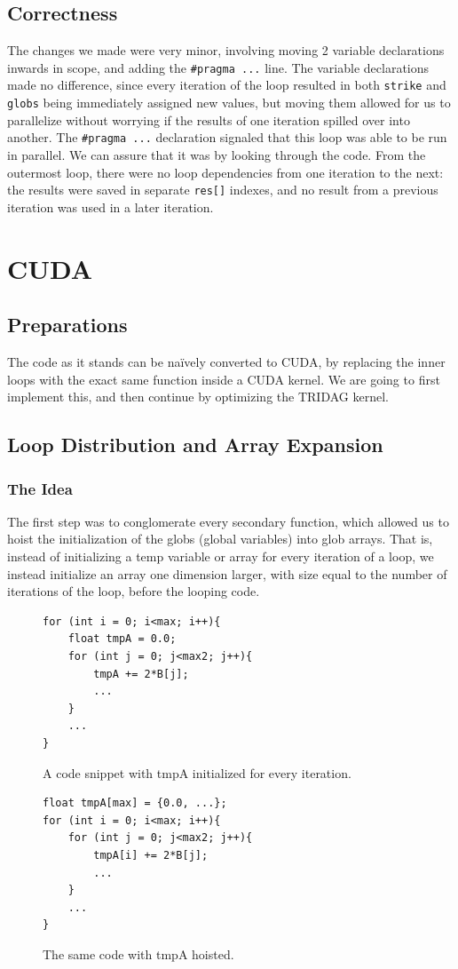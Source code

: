 \documentclass[12pt, oneside]{article}
\begin{document}
\subsection{Correctness}
The changes we made were very minor, involving moving 2 variable declarations inwards in scope, and adding the \texttt{\#pragma ...} line. The variable declarations made no difference, since every iteration of the loop resulted in both \texttt{strike} and \texttt{globs} being immediately assigned new values, but moving them allowed for us to parallelize without worrying if the results of one iteration spilled over into another. The \texttt{\#pragma ...} declaration signaled that this loop was able to be run in parallel. We can assure that it was by looking through the code. From the outermost loop, there were no loop dependencies from one iteration to the next: the results were saved in separate \texttt{res[]} indexes, and no result from a previous iteration was used in a later iteration.
\section{CUDA}
\subsection{Preparations}
The code as it stands can be na\"ively converted to CUDA, by replacing the inner loops with the exact same function inside a CUDA kernel. We are going to first implement this, and then continue by optimizing the TRIDAG kernel.
\subsection{Loop Distribution and Array Expansion}
\subsubsection{The Idea}
The first step was to conglomerate every secondary function, which allowed us to hoist the initialization of the globs (global variables) into glob arrays. That is, instead of initializing a temp variable or array for every iteration of a loop, we instead initialize an array one dimension larger, with size equal to the number of iterations of the loop, before the looping code.
\begin{figure}[h]
	\begin{lstlisting}
for (int i = 0; i<max; i++){
	float tmpA = 0.0;
	for (int j = 0; j<max2; j++){
		tmpA += 2*B[j];
		...
	}
	...
}
	\end{lstlisting}
\caption{ \label{fig:nohoist} A code snippet with tmpA initialized for every iteration.}
\end{figure}
\begin{figure}[h]
	\begin{lstlisting}
float tmpA[max] = {0.0, ...};
for (int i = 0; i<max; i++){
	for (int j = 0; j<max2; j++){
		tmpA[i] += 2*B[j];
		...
	}
	...
}
\end{lstlisting}
\caption{ \label{fig:yeshoist} The same code with tmpA hoisted.}
\end{figure}
		
\end{document}
